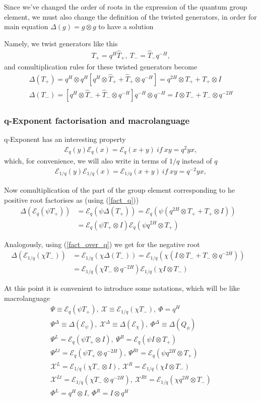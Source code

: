 \documentclass{paper}
\def\be{\begin{eqnarray}}
\def\ee{\end{eqnarray}}
\def\me{\mathcal{E}}
\def\dg{\Delta \lb g \rb}
\def\lb{\left (}
\def\rb{\right )}
\def\lsb{\left [}
\def\rsb{\right ]}
\def\gog{g \otimes g}
\def\Chi{\mathcal{X}}
\newcommand{\EChiL}[0]{\Chi^L}
\newcommand{\EChiR}[0]{\Chi^R}
\newcommand{\EChiLT}[0]{\Chi^{Lt}}
\newcommand{\EChiRT}[0]{\Chi^{Rt}}
\newcommand{\EChiD}[0]{\Chi^\Delta}
\newcommand{\EPsiL}[0]{\Psi^L}
\newcommand{\EPsiR}[0]{\Psi^R}
\newcommand{\EPsiLT}[0]{\Psi^{Lt}}
\newcommand{\EPsiRT}[0]{\Psi^{Rt}}
\newcommand{\EPsiD}[0]{\Psi^\Delta}
\newcommand{\QPhiL}[0]{\Phi^L}
\newcommand{\QPhiR}[0]{\Phi^R}
\newcommand{\QPhiD}[0]{\Phi^\Delta}
\newcommand{\comul}[1]{\Delta \lb #1 \rb}
\begin{document}
Since we've changed the order of roots in the expression of the quantum group element, we must also change the
definition of the twisted generators, in order for main equation $\dg = \gog$ to have a solution

Namely, we twist generators like this
\be
T_+ = q^H \hat{T}_+,\ T_- = \hat{T}_- q^{-H},
\ee
and comultiplication rules for these twisted generators become
\be
\comul{T_+} = q^H \otimes q^H \lsb q^H \otimes \hat{T}_+ + \hat{T}_+ \otimes q^{-H} \rsb = q^{2H} \otimes T_+ + T_+ \otimes I \\
\comul{T_-} = \lsb q^H \otimes \hat{T}_- + \hat{T}_- \otimes q^{-H} \rsb q^{-H} \otimes q^{-H} = I \otimes T_- + T_- \otimes q^{-2H}
\ee

\subsubsection{q-Exponent factorisation and macrolanguage}
q-Exponent has an interesting property
\be
\me_q(y)\me_q(x) = \me_q(x + y)\ if\ xy = q^2 yx, \label{fact_q}
\ee
which, for convenience, we will also write in terms of $1/q$ instead of $q$
\be
\me_{1/q}(y)\me_{1/q}(x) = \me_{1/q}(x + y)\ if\ xy = q^{-2} yx, \label{fact_over_q}
\ee

Now comultiplication of the part of the group element corresponding to he positive root factorises as (using (\ref{fact_q}))
\be
\comul{\me_q \lb \psi T_+ \rb} & = \me_q \lb \psi \comul{T_+}\rb = \me_q \lb \psi \lb q^{2H} \otimes T_+ + T_+ \otimes I \rb \rb & \\
& = \me_q \lb \psi T_+ \otimes I\rb \me_q \lb \psi q^{2H} \otimes T_+\rb
\ee

Analogously, using (\ref{fact_over_q}) we get for the negative root
\be
\comul{\me_{1/q} \lb \chi T_- \rb} & = \me_{1/q} \lb \chi \comul{T_-}\rb = \me_{1/q} \lb \chi \lb I \otimes T_- + T_- \otimes q^{-2H} \rb \rb & \\
& = \me_{1/q} \lb \chi T_- \otimes q^{-2H}\rb \me_{1/q} \lb \chi I \otimes T_-\rb
\ee

At this point it is convenient to introduce some notations, which will be like macrolanguage
\be
\Psi \equiv \me_q \lb \psi T_+ \rb,\ \Chi \equiv \me_{1/q} \lb \chi T_- \rb,\ \Phi = q^H \\
\EPsiD \equiv \comul{\me_\psi},\ \EChiD \equiv \comul{\me_\chi},\ \QPhiD \equiv \comul{Q_\phi} \\
\EPsiL = \me_q \lb \psi T_+ \otimes I\rb,\ \EPsiR = \me_q \lb \psi I \otimes T_+ \rb \\
\EPsiLT = \me_q \lb \psi T_+ \otimes q^{-2H}\rb,\ \EPsiRT = \me_q \lb \psi q^{2H} \otimes T_+ \rb \\
\EChiL = \me_{1/q} \lb \chi T_- \otimes I\rb,\ \EChiR = \me_{1/q} \lb \chi I \otimes T_- \rb \\
\EChiLT = \me_{1/q} \lb \chi T_- \otimes q^{-2H}\rb,\ \EChiRT = \me_{1/q} \lb \chi q^{2H} \otimes T_- \rb \\
\QPhiL = q^H \otimes I,\ \QPhiR = I \otimes q^H
\ee
\end{document}
